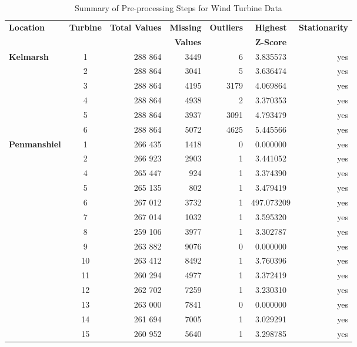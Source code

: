 \documentclass{article}
\begin{document}
\begin{table}
\footnotesize
\centering
\caption{Summary of Pre-processing Steps for Wind Turbine Data}
    \begin{tabular}{l|c|r|r|r|S|r}
    \toprule
    \textbf{Location} & \textbf{Turbine} & \textbf{Total Values} & \textbf{Missing} & \textbf{Outliers} & \textbf{Highest} & \textbf{Stationarity} \\
     & & & \textbf{Values} & & \textbf{Z-Score} & \\
    \midrule
\textbf{Kelmarsh} & 1 & 288 864 & 3449 & 6 & 3.835573 & yes \\
         & 2 & 288 864 & 3041 & 5 & 3.636474 & yes \\
         & 3 & 288 864 & 4195 & 3179 & 4.069864 & yes \\
         & 4 & 288 864 & 4938 & 2 & 3.370353 & yes \\
         & 5 & 288 864 & 3937 & 3091 & 4.793479 & yes \\
         & 6 & 288 864 & 5072 & 4625 & 5.445566 & yes \\
    \midrule
\textbf{Penmanshiel} & 1 & 266 435 & 1418 & 0 & 0.000000 & yes \\
            & 2 & 266 923 & 2903 & 1 & 3.441052 & yes \\
            & 4 & 265 447 & 924 & 1 & 3.374390 & yes \\
            & 5 & 265 135 & 802 & 1 & 3.479419 & yes \\
            & 6 & 267 012 & 3732 & 1 & 497.073209 & yes \\
            & 7 & 267 014 & 1032 & 1 & 3.595320 & yes \\
            & 8 & 259 106 & 3977 & 1 & 3.302787 & yes \\
            & 9 & 263 882 & 9076 & 0 & 0.000000 & yes \\
            & 10 & 263 412 & 8492 & 1 & 3.760396 & yes \\
            & 11 & 260 294 & 4977 & 1 & 3.372419 & yes \\
            & 12 & 262 702 & 7259 & 1 & 3.230310 & yes \\
            & 13 & 263 000 & 7841 & 0 & 0.000000 & yes \\
            & 14 & 261 694 & 7005 & 1 & 3.029291 & yes \\
            & 15 & 260 952 & 5640 & 1 & 3.298785 & yes \\
    \bottomrule
    \end{tabular}
\label{tab:preprocessing_windturbines}
\end{table}
\end{document}

